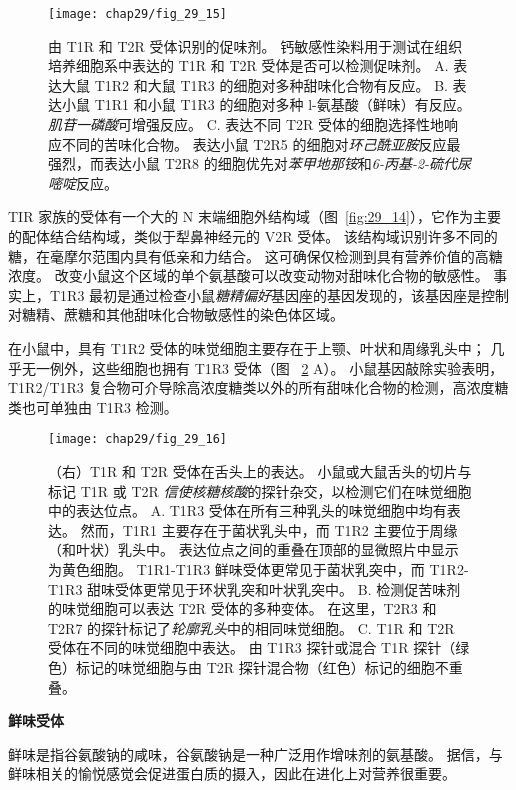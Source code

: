 \begin{figure}[htbp]
	\centering
	\texttt{[image: chap29/fig\_29\_15]}
	\caption{由 T1R 和 T2R 受体识别的促味剂。
		钙敏感性染料用于测试在组织培养细胞系中表达的 T1R 和 T2R 受体是否可以检测促味剂。
		A. 表达大鼠 T1R2 和大鼠 T1R3 的细胞对多种甜味化合物有反应。
		B. 表达小鼠 T1R1 和小鼠 T1R3 的细胞对多种 l-氨基酸（鲜味）有反应。
		\textit{肌苷一磷酸}可增强反应。
		C. 表达不同 T2R 受体的细胞选择性地响应不同的苦味化合物。
		表达小鼠 T2R5 的细胞对\textit{环己酰亚胺}反应最强烈，而表达小鼠 T2R8 的细胞优先对\textit{苯甲地那铵}和\textit{6-丙基-2-硫代尿嘧啶}反应。}
	\label{fig:29_15}
\end{figure}


TIR 家族的受体有一个大的 N 末端细胞外结构域（图~\ref{fig:29_14}），它作为主要的配体结合结构域，类似于犁鼻神经元的 V2R 受体。
该结构域识别许多不同的糖，在毫摩尔范围内具有低亲和力结合。
这可确保仅检测到具有营养价值的高糖浓度。
改变小鼠这个区域的单个氨基酸可以改变动物对甜味化合物的敏感性。
事实上，T1R3 最初是通过检查小鼠\textit{糖精偏好}基因座的基因发现的，该基因座是控制对糖精、蔗糖和其他甜味化合物敏感性的染色体区域。


在小鼠中，具有 T1R2 受体的味觉细胞主要存在于上颚、叶状和周缘乳头中；
几乎无一例外，这些细胞也拥有 T1R3 受体（图 ~\ref{fig:29_16} A）。
小鼠基因敲除实验表明，T1R2/T1R3 复合物可介导除高浓度糖类以外的所有甜味化合物的检测，高浓度糖类也可单独由 T1R3 检测。


\begin{figure}[htbp]
	\centering
	\texttt{[image: chap29/fig\_29\_16]}
	\caption{（右）T1R 和 T2R 受体在舌头上的表达。 小鼠或大鼠舌头的切片与标记 T1R 或 T2R \textit{信使核糖核酸}的探针杂交，以检测它们在味觉细胞中的表达位点。
		A. T1R3 受体在所有三种乳头的味觉细胞中均有表达。
		然而，T1R1 主要存在于菌状乳头中，而 T1R2 主要位于周缘（和叶状）乳头中。
		表达位点之间的重叠在顶部的显微照片中显示为黄色细胞。
		T1R1-T1R3 鲜味受体更常见于菌状乳突中，而 T1R2-T1R3 甜味受体更常见于环状乳突和叶状乳突中。
		B. 检测促苦味剂的味觉细胞可以表达 T2R 受体的多种变体。
		在这里，T2R3 和 T2R7 的探针标记了\textit{轮廓乳头}中的相同味觉细胞。
		C. T1R 和 T2R 受体在不同的味觉细胞中表达。
		由 T1R3 探针或混合 T1R 探针（绿色）标记的味觉细胞与由 T2R 探针混合物（红色）标记的细胞不重叠。}
	\label{fig:29_16}
\end{figure}


\textbf{鲜味受体}

鲜味是指谷氨酸钠的咸味，谷氨酸钠是一种广泛用作增味剂的氨基酸。
据信，与鲜味相关的愉悦感觉会促进蛋白质的摄入，因此在进化上对营养很重要。


